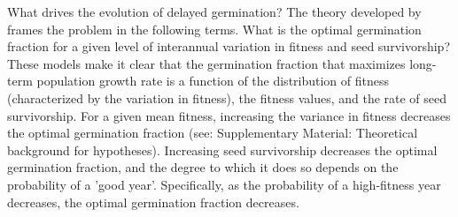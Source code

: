 \documentclass[12pt, oneside, titlepage]{article}   	%
\begin{document}
What drives the evolution of delayed germination? The theory developed by \cite{cohen1966} frames the problem in the following terms. What is the optimal germination fraction for a given level of interannual variation in fitness and seed survivorship? These models make it clear that the germination fraction that maximizes long-term population growth rate is a function of the distribution of fitness (characterized by the variation in fitness), the fitness values, and the rate of seed survivorship. For a given mean fitness, increasing the variance in fitness decreases the optimal germination fraction (see: Supplementary Material: Theoretical background for hypotheses). Increasing seed survivorship decreases the optimal germination fraction, and the degree to which it does so depends on the probability of a 'good year'. Specifically, as the probability of a high-fitness year decreases, the optimal germination fraction decreases. 


\end{document}
